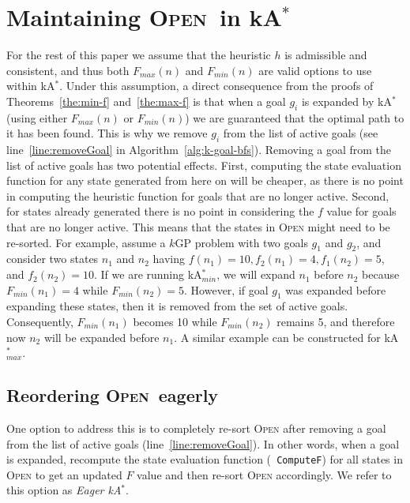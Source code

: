 \documentclass{aicom2e}
\newcommand{\kgs}{$k$GP}
\newcommand{\kastar}{kA$^*$}
\newcommand{\kastarmin}{kA$^*_{min}$}
\newcommand{\kastarmax}{kA$^*_{max}$}
\newcommand{\minf}{$F_{min}(n)$}
\newcommand{\maxf}{$F_{max}(n)$}
\newcommand{\open}{\textsc{Open}}
\begin{document}
\section{Maintaining \open\ in \kastar{}} \label{sec:lazy}


For the rest of this paper we assume that the heuristic $h$ is admissible and
consistent, and thus both \maxf{} and \minf{} are valid options to use within
\kastar{}. Under this assumption, a direct consequence from the proofs of
Theorems~\ref{the:min-f} and~\ref{the:max-f} is that when a goal $g_i$ is
expanded by \kastar{} (using either \maxf{} or \minf{}) we are guaranteed that
the optimal path to it has been found. This is why we remove $g_i$ from the
list of active goals (see line~\ref{line:removeGoal} in
Algorithm~\ref{alg:k-goal-bfs}). Removing a goal from the list of active goals
has two potential effects. First, computing the state evaluation function for
any state generated from here on will be cheaper, as there is no point in
computing the heuristic function for goals that are no longer active. Second,
for states already generated there is no point in considering the $f$ value for
goals that are no longer active. This means that the states in \open{} might
need to be re-sorted. For example, assume a \kgs{} problem with two goals $g_1$
and $g_2$, and consider two states $n_1$ and $n_2$ having $f(n_1)=10,
f_2(n_1)=4, f_1(n_2)=5$, and $f_2(n_2)=10$. If we are running \kastarmin{}, we
will expand $n_1$ before $n_2$ because $F_{min}(n_1)=4$ while $F_{min}(n_2)=5$.
However, if goal $g_1$ was expanded before expanding these states, then it is
removed from the set of active goals. Consequently, $F_{min}(n_1)$ becomes 10
while $F_{min}(n_2)$ remains 5, and therefore now $n_2$ will be expanded before
$n_1$. A similar example can be constructed for \kastarmax{}.

\subsection{Reordering \open\ eagerly}

One option to address this is to completely re-sort \open{} after removing a
goal from the list of active goals (line~\ref{line:removeGoal}). In other
words, when a goal is expanded, recompute the state evaluation function ({\tt
ComputeF}) for all states in \open{} to get an updated $F$ value and then
re-sort \open{} accordingly. We refer to this option as {\em Eager \kastar{}}. 
\end{document}
